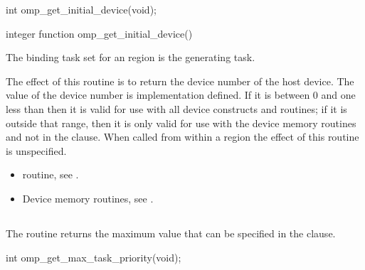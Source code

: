 \begin{samepage}
\format
\begin{ccppspecific}
\begin{ompcFunction}
int omp_get_initial_device(void);
\end{ompcFunction}
\end{ccppspecific}
\end{samepage}

\begin{fortranspecific}
\begin{ompfFunction}
integer function omp_get_initial_device()
\end{ompfFunction}
\end{fortranspecific}

\binding
The binding task set for an  region is the generating task.

\effect
The effect of this routine is to return the device number of the host device.
The value of the device number is implementation defined. If it is between 0
and one less than  then it is valid for use
with all device constructs and routines; if it is outside that range, then
it is only valid for use with the device memory routines and not in the
 clause. When called from within a  region
the effect of this routine is unspecified.

\crossreferences
\begin{itemize}

\item {} routine, see
.

\item Device memory routines, see .
\end{itemize}




\subsection{}
\label{subsec:omp_get_max_task_priority}
\summary

The  routine returns the maximum value that can be
specified in the  clause.

\begin{samepage}
\format
\begin{ccppspecific}
\begin{ompcFunction}
int omp_get_max_task_priority(void);
\end{ompcFunction}
\end{ccppspecific}
\end{samepage}

